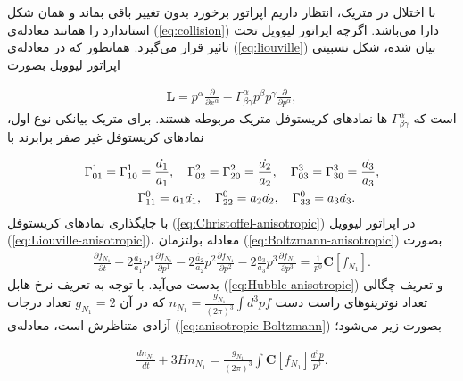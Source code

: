 \documentclass[a4paper]{book}
\begin{document}
با اختلال در متریک، انتظار داریم اپراتور برخورد بدون تغییر باقی بماند و همان شکل استاندارد را همانند معادله‌ی (\ref{eq:collision}) دارا می‌باشد. اگرچه اپراتور لیوویل تحت تاثیر قرار می‌گیرد. همانطور که در معادله‌ی (\ref{eq:liouville}) بیان شده، شکل نسبیتی اپراتور لیوویل بصورت
\par
\vspace{-0.5cm}
{\footnotesize\begin{align}
		\boldsymbol{L}=p^{\alpha}\frac{\partial}{\partial x^{\alpha}}-\Gamma^{\alpha}_{\beta \gamma} p^{\beta} p^{\gamma} \frac{\partial}{\partial p^{\alpha}},
		\label{eq:Liouville-anisotropic}
\end{align}}
است که {\footnotesize$\Gamma^{\alpha}_{\beta \gamma}$} ها نمادهای کریستوفل متریک مربوطه هستند. برای متریک بیانکی نوع اول، نمادهای کریستوفل غیر صفر برابرند با
\par
\vspace{-0.5cm}
{\footnotesize\begin{align}
	\Gamma^{1}_{0 1}=\Gamma^{1}_{1 0}&=\frac{\dot{a_1}}{a_1}, \quad \Gamma^{2}_{0 2}=\Gamma^{2}_{2 0}=\frac{\dot{a_2}}{a_2}, \quad \Gamma^{3}_{0 3}=\Gamma^{3}_{3 0}=\frac{\dot{a_3}}{a_3}, \notag  \\
	&\Gamma^{0}_{1 1}=a_1\dot{a_1}, \quad \Gamma^{0}_{2 2}=a_2\dot{a_2}, \quad \Gamma^{0}_{3 3}=a_3\dot{a_3}.
	\label{eq:Christoffel-anisotropic}
\end{align}}
با جایگذاری نمادهای کریستوفل (\ref{eq:Christoffel-anisotropic}) در اپراتور لیوویل (\ref{eq:Liouville-anisotropic})، معادله بولتزمان (\ref{eq:Boltzmann-anisotropic}) بصورت
{\footnotesize\begin{align}
	\frac{\partial f_{N_1}}{\partial t} - 2 \frac{\dot{a_1}}{a_1} p^1 \frac{\partial f_{N_1}}{\partial p^1} - 2 \frac{\dot{a_2}}{a_2} p^2 \frac{\partial f_{N_1}}{\partial p^2} - 2 \frac{\dot{a_3}}{a_3} p^3 \frac{\partial f_{N_1}}{\partial p^3} = \frac{1}{p^0} \boldsymbol{C}[f_{N_1}].
	\label{eq:anisotropic-Boltzmann}
\end{align}}
بدست می‌آید. با توجه به تعریف نرخ هابل (\ref{eq:Hubble-anisotropic}) و تعریف چگالی تعداد نوترینوهای راست دست {\footnotesize$n_{N_1}=\frac{g_{N_1}}{(2\pi)^3}\int d^3p f$} که در آن {\footnotesize$g_{N_1}=2$} تعداد درجات آزادی متناظرش است، معادله‌ی (\ref{eq:anisotropic-Boltzmann}) بصورت زیر می‌شود؛
\par
\vspace{-0.5cm}
{\footnotesize\begin{align}
	\frac{dn_{N_1}}{dt}+3Hn_{N_1} = \frac{g_{N_1}}{(2\pi)^3} \int \boldsymbol{C}[f_{N_1}] \frac{d^3p}{p^0}.
\end{align}}
\end{document}
